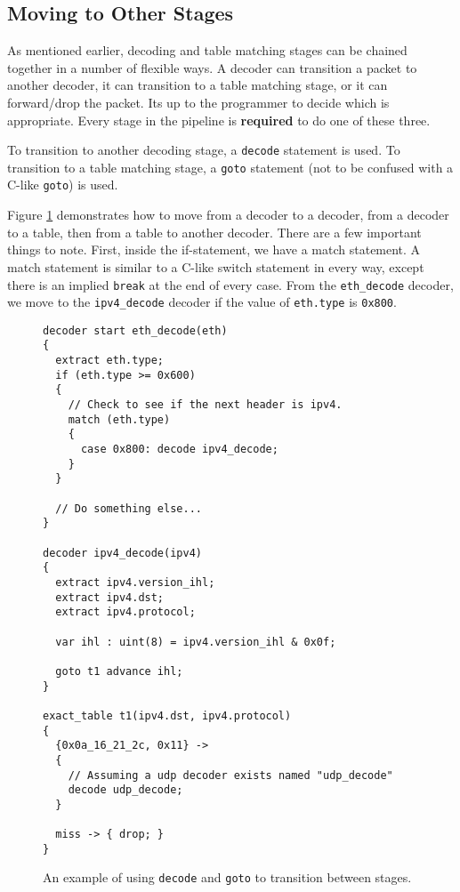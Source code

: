 \subsection{Moving to Other Stages} \label{decoder_next_tut}

As mentioned earlier, decoding and table matching stages can be chained together in a number of flexible ways. A decoder can transition a packet to another decoder, it can transition to a table matching stage, or it can forward/drop the packet. Its up to the programmer to decide which is appropriate. Every stage in the pipeline is \textbf{required} to do one of these three.

To transition to another decoding stage, a \texttt{decode} statement is used. To transition to a table matching stage, a \texttt{goto} statement (not to be confused with a C-like \texttt{goto}) is used. 

Figure \ref{fg:transition_ex} demonstrates how to move from a decoder to a decoder, from a decoder to a table, then from a table to another decoder. There are a few important things to note. First, inside the if-statement, we have a match statement. A match statement is similar to a C-like switch statement in every way, except there is an implied \texttt{break} at the end of every case. From the \texttt{eth\_decode} decoder, we move to the \texttt{ipv4\_decode} decoder if the value of \texttt{eth.type} is \texttt{0x800}. 

\begin{figure}
\begin{lstlisting}
decoder start eth_decode(eth)
{
  extract eth.type;
  if (eth.type >= 0x600) 
  {
  	// Check to see if the next header is ipv4.
    match (eth.type)
    {
      case 0x800: decode ipv4_decode;
    }
  }
  
  // Do something else...
}

decoder ipv4_decode(ipv4)
{
  extract ipv4.version_ihl;
  extract ipv4.dst;
  extract ipv4.protocol;
  
  var ihl : uint(8) = ipv4.version_ihl & 0x0f;
  
  goto t1 advance ihl;
}

exact_table t1(ipv4.dst, ipv4.protocol)
{
  {0x0a_16_21_2c, 0x11} ->
  {
    // Assuming a udp decoder exists named "udp_decode"
    decode udp_decode;
  }
  
  miss -> { drop; }
}
\end{lstlisting}
\caption{An example of using \texttt{decode} and \texttt{goto} to transition between stages.}
\label{fg:transition_ex}
\end{figure}

